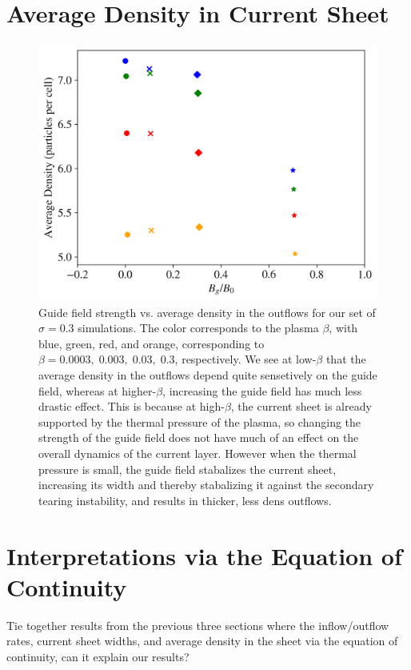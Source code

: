 \documentclass[iop,twocolappendix]{emulateapj}
\begin{document}
\section{Average Density in Current Sheet}
\begin{figure}[!h]
	\includegraphics[width=\linewidth]{sig_3_bguide_vs_dens.png}
	\caption{Guide field strength vs. average density in the outflows for our set of $\sigma=0.3$ simulations.  The color corresponds to the plasma $\beta$, with blue, green, red, and orange, corresponding to $\beta=0.0003, \; 0.003,  \; 0.03, \;0.3 $, respectively.  We see at low-$\beta$ that the average density in the outflows depend quite sensetively on the guide field, whereas at higher-$\beta$, increasing the guide field has much less drastic effect.  This is because at high-$\beta$, the current sheet is already supported by the thermal pressure of the plasma, so changing the strength of the guide field does not have much of an effect on the overall dynamics of the current layer.  However when the thermal pressure is small, the guide field stabalizes the current sheet, increasing its width and thereby stabalizing it against the secondary tearing instability, and results in thicker, less dens outflows.
	}
	\label{highbeta_outflow_flds}
\end{figure}


\section{Interpretations via the Equation of Continuity}
Tie together results from the previous three sections where the inflow/outflow rates, current sheet widths, and average density in the sheet via the equation of continuity, can it explain our results?
\end{document}
